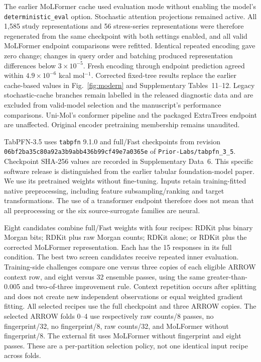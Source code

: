 The earlier MoLFormer cache used evaluation mode without enabling the model's
\nolinkurl{deterministic_eval} option. Stochastic attention projections remained
active. All 1,585 study representations and 56 stress-series representations were
therefore regenerated from the same checkpoint with both settings enabled, and
all valid MoLFormer endpoint comparisons were refitted. Identical repeated encoding
gave zero change; changes in query order and batching produced representation
differences below $3\times10^{-5}$. Fresh encoding through endpoint prediction
agreed within $4.9\times10^{-6}$ kcal mol$^{-1}$. Corrected fixed-tree results
replace the earlier cache-based values in Fig.~\ref{fig:modern} and Supplementary Tables~11--12.
Legacy stochastic-cache branches remain labelled in the released diagnostic data
and are excluded from valid-model selection and the manuscript's performance
comparisons. Uni-Mol's conformer pipeline and the packaged ExtraTrees endpoint are
unaffected. Original encoder pretraining membership remains unaudited.

TabPFN-3.5 uses \texttt{tabpfn} 9.1.0 and full/Fast checkpoints from revision
\nolinkurl{06bf2ba35c80a92a3b9abb436b99cf49e7a0365e} of
\nolinkurl{Prior-Labs/tabpfn_3_5}.\cite{tabpfn35} Checkpoint SHA-256 values are
recorded in Supplementary Data~6. This specific software release is distinguished
from the earlier tabular foundation-model paper.\cite{tabpfn2025} We use its
pretrained weights without fine-tuning. Inputs retain training-fitted native
preprocessing, including feature subsampling/ranking and target transformations.
The use of a transformer endpoint therefore does not mean that all preprocessing
or the six source-surrogate families are neural.

Eight candidates combine full/Fast weights with four recipes: RDKit plus binary
Morgan bits; RDKit plus raw Morgan counts; RDKit alone; or RDKit plus the corrected
MoLFormer representation. Each has the 15 responses in its full condition.
The best two screen candidates receive repeated inner evaluation. Training-side
challenges compare one versus three copies of each eligible ARROW context row,
and eight versus 32 ensemble passes, using the same greater-than-0.005 and
two-of-three improvement rule. Context repetition occurs after splitting and
does not create new independent observations or equal weighted gradient fitting.
All selected recipes use the full checkpoint and three ARROW copies. The selected
ARROW folds 0--4 use respectively raw counts/8 passes, no fingerprint/32,
no fingerprint/8, raw counts/32, and MoLFormer without fingerprint/8. The external
fit uses MoLFormer without fingerprint and eight passes. These are a per-partition
selection policy, not one identical input recipe across folds.

